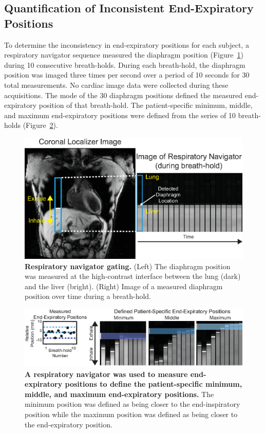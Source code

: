 \subsection{Quantification of Inconsistent End-Expiratory Positions}
	To determine the inconsistency in end-expiratory positions for each subject, a respiratory navigator sequence measured the diaphragm position (Figure~\ref{fig:navGatingExplanationCartoon}) during 10 consecutive breath-holds. During each breath-hold, the diaphragm position was imaged three times per second over a period of 10 seconds for 30 total measurements. No cardiac image data were collected during these acquisitions. The mode of the 30 diaphragm positions defined the measured end-expiratory position of that breath-hold. The patient-specific minimum, middle, and maximum end-expiratory positions were defined from the series of 10 breath-holds (Figure~\ref{fig:translatedAccWindowBlue}).
	
	\begin{figure} 
		\includegraphics{figures/strainpaper/Fig2-navigator_gating_explanation_NoAccWin}
		\caption[Respiratory navigator gating]{\textbf{Respiratory navigator gating.} (Left) The diaphragm position was measured at the high-contrast interface between the lung (dark) and the liver (bright). (Right) Image of a measured diaphragm position over time during a breath-hold.}
		\label{fig:navGatingExplanationCartoon}
	\end{figure}
	
	\begin{figure} 
		\includegraphics{figures/strainpaper/Fig3-definedTranslatedAccWindow}
		\caption[A respiratory navigator was used to measure end-expiratory positions to define the patient-specific minimum, middle, and maximum end-expiratory positions]{\textbf{A respiratory navigator was used to measure end-expiratory positions to define the patient-specific minimum, middle, and maximum end-expiratory positions.} The minimum position was defined as being closer to the end-inspiratory position while the maximum position was defined as being closer to the end-expiratory position.}
		\label{fig:translatedAccWindowBlue}
	\end{figure}
	
